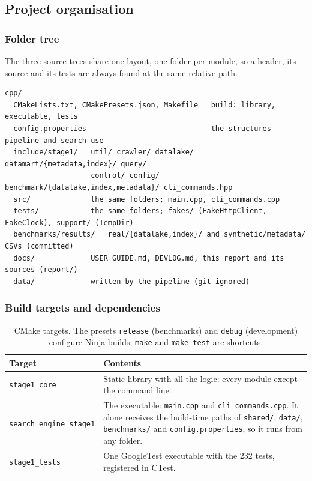 \documentclass[11pt,a4paper]{article}
\newcommand{\code}[1]{\texttt{#1}}
\begin{document}
\subsection{Project organisation}

\subsubsection{Folder tree}
The three source trees share one layout, one folder per module, so a header, its source and its
tests are always found at the same relative path.
\begin{lstlisting}[style=shell]
cpp/
  CMakeLists.txt, CMakePresets.json, Makefile   build: library, executable, tests
  config.properties                             the structures pipeline and search use
  include/stage1/   util/ crawler/ datalake/ datamart/{metadata,index}/ query/
                    control/ config/ benchmark/{datalake,index,metadata}/ cli_commands.hpp
  src/              the same folders; main.cpp, cli_commands.cpp
  tests/            the same folders; fakes/ (FakeHttpClient, FakeClock), support/ (TempDir)
  benchmarks/results/   real/{datalake,index}/ and synthetic/metadata/ CSVs (committed)
  docs/             USER_GUIDE.md, DEVLOG.md, this report and its sources (report/)
  data/             written by the pipeline (git-ignored)
\end{lstlisting}

\subsubsection{Build targets and dependencies}
\begin{table}[H]
\centering\small
\begin{tabularx}{\linewidth}{@{}L{4.0cm} Y@{}}
\toprule
Target & Contents \\
\midrule
\code{stage1\_core} & Static library with all the logic: every module except the command line. \\
\code{search\_engine\_stage1} & The executable: \code{main.cpp} and \code{cli\_commands.cpp}. It alone receives the build-time paths of \code{shared/}, \code{data/}, \code{benchmarks/} and \code{config.properties}, so it runs from any folder. \\
\code{stage1\_tests} & One GoogleTest executable with the 232 tests, registered in CTest. \\
\bottomrule
\end{tabularx}
\caption{CMake targets. The presets \code{release} (benchmarks) and \code{debug} (development) configure Ninja builds; \code{make} and \code{make test} are shortcuts.}
\end{table}
\end{document}
